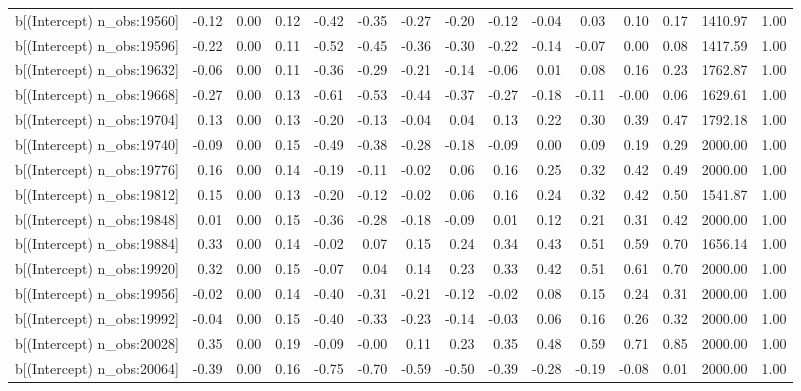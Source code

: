 \begin{table}[ht]
\begin{tabular}{rrrrrrrrrrrrrrr}
  b[(Intercept) n\_obs:19560] & -0.12 & 0.00 & 0.12 & -0.42 & -0.35 & -0.27 & -0.20 & -0.12 & -0.04 & 0.03 & 0.10 & 0.17 & 1410.97 & 1.00 \\ 
  b[(Intercept) n\_obs:19596] & -0.22 & 0.00 & 0.11 & -0.52 & -0.45 & -0.36 & -0.30 & -0.22 & -0.14 & -0.07 & 0.00 & 0.08 & 1417.59 & 1.00 \\ 
  b[(Intercept) n\_obs:19632] & -0.06 & 0.00 & 0.11 & -0.36 & -0.29 & -0.21 & -0.14 & -0.06 & 0.01 & 0.08 & 0.16 & 0.23 & 1762.87 & 1.00 \\ 
  b[(Intercept) n\_obs:19668] & -0.27 & 0.00 & 0.13 & -0.61 & -0.53 & -0.44 & -0.37 & -0.27 & -0.18 & -0.11 & -0.00 & 0.06 & 1629.61 & 1.00 \\ 
  b[(Intercept) n\_obs:19704] & 0.13 & 0.00 & 0.13 & -0.20 & -0.13 & -0.04 & 0.04 & 0.13 & 0.22 & 0.30 & 0.39 & 0.47 & 1792.18 & 1.00 \\ 
  b[(Intercept) n\_obs:19740] & -0.09 & 0.00 & 0.15 & -0.49 & -0.38 & -0.28 & -0.18 & -0.09 & 0.00 & 0.09 & 0.19 & 0.29 & 2000.00 & 1.00 \\ 
  b[(Intercept) n\_obs:19776] & 0.16 & 0.00 & 0.14 & -0.19 & -0.11 & -0.02 & 0.06 & 0.16 & 0.25 & 0.32 & 0.42 & 0.49 & 2000.00 & 1.00 \\ 
  b[(Intercept) n\_obs:19812] & 0.15 & 0.00 & 0.13 & -0.20 & -0.12 & -0.02 & 0.06 & 0.16 & 0.24 & 0.32 & 0.42 & 0.50 & 1541.87 & 1.00 \\ 
  b[(Intercept) n\_obs:19848] & 0.01 & 0.00 & 0.15 & -0.36 & -0.28 & -0.18 & -0.09 & 0.01 & 0.12 & 0.21 & 0.31 & 0.42 & 2000.00 & 1.00 \\ 
  b[(Intercept) n\_obs:19884] & 0.33 & 0.00 & 0.14 & -0.02 & 0.07 & 0.15 & 0.24 & 0.34 & 0.43 & 0.51 & 0.59 & 0.70 & 1656.14 & 1.00 \\ 
  b[(Intercept) n\_obs:19920] & 0.32 & 0.00 & 0.15 & -0.07 & 0.04 & 0.14 & 0.23 & 0.33 & 0.42 & 0.51 & 0.61 & 0.70 & 2000.00 & 1.00 \\ 
  b[(Intercept) n\_obs:19956] & -0.02 & 0.00 & 0.14 & -0.40 & -0.31 & -0.21 & -0.12 & -0.02 & 0.08 & 0.15 & 0.24 & 0.31 & 2000.00 & 1.00 \\ 
  b[(Intercept) n\_obs:19992] & -0.04 & 0.00 & 0.15 & -0.40 & -0.33 & -0.23 & -0.14 & -0.03 & 0.06 & 0.16 & 0.26 & 0.32 & 2000.00 & 1.00 \\ 
  b[(Intercept) n\_obs:20028] & 0.35 & 0.00 & 0.19 & -0.09 & -0.00 & 0.11 & 0.23 & 0.35 & 0.48 & 0.59 & 0.71 & 0.85 & 2000.00 & 1.00 \\ 
  b[(Intercept) n\_obs:20064] & -0.39 & 0.00 & 0.16 & -0.75 & -0.70 & -0.59 & -0.50 & -0.39 & -0.28 & -0.19 & -0.08 & 0.01 & 2000.00 & 1.00 \\ 

\end{tabular}
\end{table}

